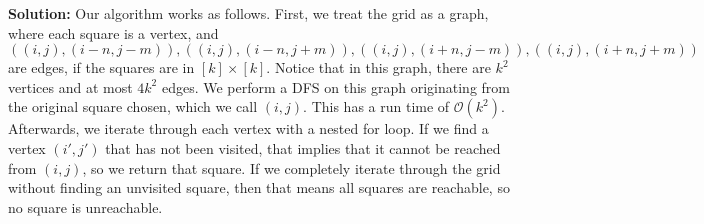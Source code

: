 \documentclass{assignment-263}
\begin{document}
 \textbf{Solution:} Our algorithm works as follows. First, we treat the grid as a graph, where each square is a vertex, and
 \[
  ((i,j), (i - n, j - m)),((i,j), (i - n, j + m)),((i,j), (i + n, j - m)),((i,j), (i + n, j + m))
 \]
 are edges, if the squares are in \([k]\times [k]\). Notice that in this graph, there are \(k^2\) vertices and at most \(4k^2\) edges. We perform a DFS on this graph originating from the original square chosen, which we call \((i,j)\). This has a run time of \(\mathcal{O} (k^2)\). Afterwards, we iterate through each vertex with a nested for loop. If we find a vertex \((i', j')\) that has not been visited, that implies that it cannot be reached from \((i,j)\), so we return that square. If we completely iterate through the grid without finding an unvisited square, then that means all squares are reachable, so no square is unreachable.

\program
\end{document}

